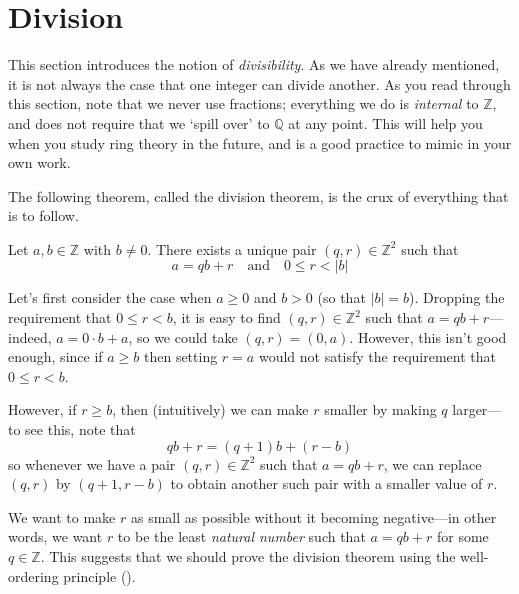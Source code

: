 \section{Division}




This section introduces the notion of \textit{divisibility}. As we have already mentioned, it is not always the case that one integer can divide another. As you read through this section, note that we never use fractions; everything we do is \textit{internal} to $\mathbb{Z}$, and does not require that we `spill over' to $\mathbb{Q}$ at any point. This will help you when you study ring theory in the future, and is a good practice to mimic in your own work.

The following theorem, called the division theorem, is the crux of everything that is to follow.

\begin{theorem}
\label{thmDivisionTheorem}
Let $a,b \in \mathbb{Z}$ with $b \ne 0$. There exists a unique pair $(q,r) \in \mathbb{Z}^2$ such that
\[ a = qb + r \quad \text{and} \quad 0 \le r < |b| \]
\end{theorem}

\begin{strategy*}
Let's first consider the case when $a \ge 0$ and $b > 0$ (so that $|b|=b$). Dropping the requirement that $0 \le r < b$, it is easy to find $(q,r) \in \mathbb{Z}^2$ such that $a=qb+r$---indeed, $a = 0 \cdot b + a$, so we could take $(q,r) = (0,a)$. However, this isn't good enough, since if $a \ge b$ then setting $r=a$ would not satisfy the requirement that $0 \le r < b$.

However, if $r \ge b$, then (intuitively) we can make $r$ smaller by making $q$ larger---to see this, note that
\[ qb + r = (q+1)b + (r-b) \]
so whenever we have a pair $(q,r) \in \mathbb{Z}^2$ such that $a=qb+r$, we can replace $(q,r)$ by $(q+1,r-b)$ to obtain another such pair with a smaller value of $r$.

We want to make $r$ as small as possible without it becoming negative---in other words, we want $r$ to be the least \textit{natural number} such that $a=qb+r$ for some $q \in \mathbb{Z}$. This suggests that we should prove the division theorem using the well-ordering principle ().
\end{strategy*}

